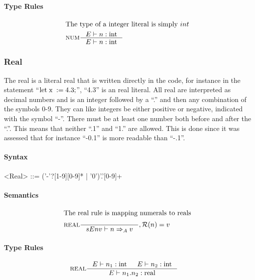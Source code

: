 \paragraph{Type Rules}

\begin{align*}
\intertext{The type of a integer literal is simply $int$}
&\inference[NUM]{\Tenv n:\Tint}
                 {\Tenv n: \Tint} 
\end{align*}

\subsubsection{Real}
The real is a literal real that is written directly in the code, for instance in the statement \enquote{$\text{let} \mathbin{\; \text{x} \;} := 4.3;$}, \enquote{4.3} is an real literal. All real are interpreted as decimal numbers and is an integer followed by a \enquote{.} and then any combination of the symbols 0-9. They can like integers be either positive or negative, indicated with the symbol \enquote{-}. There must be at least one number both before and after the \enquote{.}. This means that neither \enquote{.1} and \enquote{1.} are allowed. This is done since it was assessed that for instance \enquote{-0.1} is more readable than \enquote{-.1}.

\paragraph{Syntax}

\begin{grammar}
<Real> ::= ('-'?[1-9][0-9]* | '0')'.'[0-9]+
\end{grammar}

\paragraph{Semantics}

\begin{align*}
\intertext{The real rule is mapping numerals to reals}
&\inference[REAL]{}
                  {sEnv \vdash n \Rightarrow_A v}
                  {, \mathcal{R}(n) = v}
\end{align*}

\paragraph{Type Rules}

\begin{align*}
&\inference[REAL]{\Tenv n_1:\Tint & \Tenv n_2:\Tint}
                 {\Tenv n_1.n_2: \Treal}
\end{align*}


